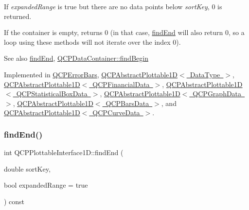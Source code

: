 If {\itshape expanded\+Range} is true but there are no data points below {\itshape sort\+Key}, 0 is returned.

If the container is empty, returns 0 (in that case, \mbox{\hyperlink{class_q_c_p_plottable_interface1_d_a5deced1016bc55a41a2339619045b295}{find\+End}} will also return 0, so a loop using these methods will not iterate over the index 0).

\begin{DoxySeeAlso}{See also}
\mbox{\hyperlink{class_q_c_p_plottable_interface1_d_a5deced1016bc55a41a2339619045b295}{find\+End}}, \mbox{\hyperlink{class_q_c_p_data_container_a2ad8a5399072d99a242d3a6d2d7e278a}{Q\+C\+P\+Data\+Container\+::find\+Begin}} 
\end{DoxySeeAlso}


Implemented in \mbox{\hyperlink{class_q_c_p_error_bars_a5c74b510f1d7254263ec18cd3a359a07}{Q\+C\+P\+Error\+Bars}}, \mbox{\hyperlink{class_q_c_p_abstract_plottable1_d_ae6ead74a0d6a17954e1857f361b9ccf2}{Q\+C\+P\+Abstract\+Plottable1\+D$<$ Data\+Type $>$}}, \mbox{\hyperlink{class_q_c_p_abstract_plottable1_d_ae6ead74a0d6a17954e1857f361b9ccf2}{Q\+C\+P\+Abstract\+Plottable1\+D$<$ Q\+C\+P\+Financial\+Data $>$}}, \mbox{\hyperlink{class_q_c_p_abstract_plottable1_d_ae6ead74a0d6a17954e1857f361b9ccf2}{Q\+C\+P\+Abstract\+Plottable1\+D$<$ Q\+C\+P\+Statistical\+Box\+Data $>$}}, \mbox{\hyperlink{class_q_c_p_abstract_plottable1_d_ae6ead74a0d6a17954e1857f361b9ccf2}{Q\+C\+P\+Abstract\+Plottable1\+D$<$ Q\+C\+P\+Graph\+Data $>$}}, \mbox{\hyperlink{class_q_c_p_abstract_plottable1_d_ae6ead74a0d6a17954e1857f361b9ccf2}{Q\+C\+P\+Abstract\+Plottable1\+D$<$ Q\+C\+P\+Bars\+Data $>$}}, and \mbox{\hyperlink{class_q_c_p_abstract_plottable1_d_ae6ead74a0d6a17954e1857f361b9ccf2}{Q\+C\+P\+Abstract\+Plottable1\+D$<$ Q\+C\+P\+Curve\+Data $>$}}.

\mbox{\label{class_q_c_p_plottable_interface1_d_a5deced1016bc55a41a2339619045b295}} 
\subsubsection{\texorpdfstring{find\+End()}{findEnd()}}
{\footnotesize\ttfamily int Q\+C\+P\+Plottable\+Interface1\+D\+::find\+End (\begin{DoxyParamCaption}\item[{double}]{sort\+Key,  }\item[{bool}]{expanded\+Range = {\ttfamily true} }\end{DoxyParamCaption}) const\hspace{0.3cm}{\ttfamily [pure virtual]}}

